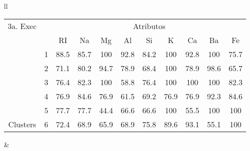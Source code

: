\begin{table}[!ht]
\begin{tabular}{ll}
   \small\addtolength{\tabcolsep}{-5pt}
     \begin{tabular}{|cl|c|c|c|c|c|c|c|c|c|}
        \hline \hline
            {\tiny 3a. Exec}     &   & \multicolumn{9}{c|}{\tiny Atributos}                                               \\ \cline{3-11} 
       \multicolumn{1}{|l}{}                            &   & RI    & Na    & Mg  & Al   & Si   & K   & Ca   & Ba  & Fe             \\ \hline
        \multicolumn{1}{|c|}{}                           & 1 & 88.5 & 85.7  & 100 & 92.8 & 84.2 & 100 & 92.8 & 100 & 75.7 \\ \cline{2-11} 
        \multicolumn{1}{|c|}{}                           & 2 & 71.1 & 80.2  & 94.7 & 78.9 & 68.4 & 100  & 78.9 &98.6 & 65.7  \\ \cline{2-11} 
        \multicolumn{1}{|c|}{}                           & 3 & 76.4   & 82.3& 100  & 58.8 & 76.4 & 100  & 100 & 100 & 82.3  \\ \cline{2-11}
        \multicolumn{1}{|c|}{}                           & 4 & 76.9   & 84.6& 76.9  & 61.5 & 69.2 & 76.9  & 76.9 & 92.3 & 84.6  \\ \cline{2-11}
        \multicolumn{1}{|c|}{}                           & 5 & 77.7   & 77.7& 44.4  & 66.6 & 66.6 & 100  & 55.5 & 100 & 100  \\ \cline{2-11}
        \multicolumn{1}{|c|}{\multirow{-3}{*}{\tiny Clusters}} & 6 & 72.4 & 68.9& 65.9  & 68.9 & 75.8 & 89.6  & 93.1 & 55.1 & 100   \\ 
        
        \hline
      \end{tabular}
    
    &
    

\end{tabular}
\end{table}
